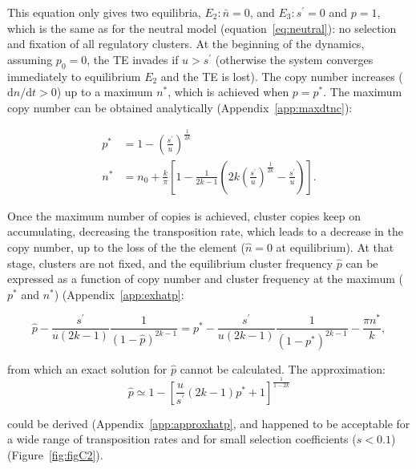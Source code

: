 \documentclass[10pt,a4paper]{article}
\begin{document}
This equation only gives two equilibria, $E_2: \bar n = 0$, and $E_3: s^\prime=0$ and $p=1$, which is the same as for the neutral model (equation~\ref{eq:neutral}): no selection and fixation of all regulatory clusters. At the beginning of the dynamics, assuming $p_0 = 0$, the TE invades if $u > s^\prime$ (otherwise the system converges immediately to equilibrium $E_2$ and the TE is lost). The copy number increases ($\mathrm d n/\mathrm d t > 0$) up to a maximum $n^\ast$, which is achieved when $p=p^\ast$. The maximum copy number can be obtained analytically (Appendix~\ref{app:maxdtnc}):

\begin{equation}\label{eq:maxdtnc}
\begin{split}
	p^\ast &= 1-\left(\frac{s^\prime}{u}\right)^\frac{1}{2k} \\
	n^\ast &= n_0 + \frac{k}{\pi}\left[ 1- \frac{1}{2k-1} \left( 2k \left( \frac{s^\prime}{u} \right)^\frac{1}{2k} - \frac{s^\prime}{u} \right) \right].
\end{split}  
\end{equation}

Once the maximum number of copies is achieved, cluster copies keep on accumulating, decreasing the transposition rate, which leads to a decrease in the copy number, up to the loss of the the element ($\hat n = 0$ at equilibrium). At that stage, clusters are not fixed, and the equilibrium cluster frequency $\hat p$ can be expressed as a function of copy number and cluster frequency at the maximum ($p^\ast$ and $n^\ast$) (Appendix~\ref{app:exhatp}:

\begin{equation}\label{eq:exhatp}
	\hat{p} - \frac{s^\prime}{u(2k-1)}\frac{1}{(1-\hat p)^{2k-1}} = p^\ast - \frac{s^\prime}{u(2k-1)}\frac{1}{(1-p^\ast)^{2k-1}} - \frac{\pi n^\ast}{k},
\end{equation}

\noindent from which an exact solution for $\hat p$ cannot be calculated. The approximation:
\begin{equation}\label{eq:approxhatp}
	\hat p \simeq 1-\left[\frac{u}{s^\prime}(2k-1)p^\ast +1\right]^\frac{1}{1-2k}
\end{equation}

\noindent could be derived (Appendix~\ref{app:approxhatp}, and happened to be acceptable for a wide range of transposition rates and for small selection coefficients ($s < 0.1$) (Figure~\ref{fig:figC2}). 
\end{document}

